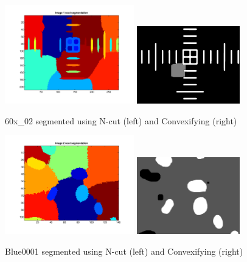 \documentclass{article}
\begin{document}
\pagebreak



\begin{figure}
\centering
\includegraphics[width=0.5\textwidth]{figures/60x_02_gc1.pdf}
\includegraphics[width=0.4\textwidth]{figures/60x_02_gc2.png}
\caption{60x\_02 segmented using N-cut (left) and Convexifying (right)}
\label{fig:60x_02_gc}
\end{figure}

\begin{figure}
\centering
\includegraphics[width=0.5\textwidth]{figures/Blue0001_gc1.pdf}
\includegraphics[width=0.4\textwidth]{figures/Blue0001_gc2.png}
\caption{Blue0001 segmented using N-cut (left) and Convexifying (right)}
\label{fig:blue_gc}
\end{figure}
\end{document}
